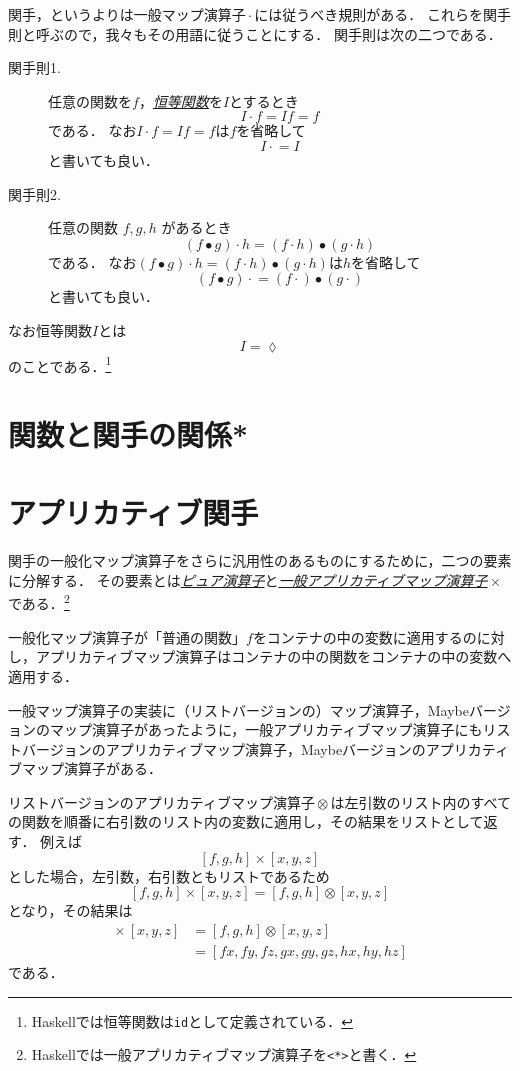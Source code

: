 \documentclass[twocolumn]{jsbook}
\newcommand{\keyword}[1]{\underline{\emph{#1}}}
\newcommand{\code}[1]{\texttt{#1}}
\DeclareMathOperator{\hsklApplicativeMap}{\times}
\DeclareMathOperator{\hsklApplicativeListMap}{\otimes}
\DeclareMathOperator{\hsklFmap}{\cdot}
\DeclareMathOperator{\mathCompose}{\bullet}
\newcommand{\mathLambdaAnonymousParameter}{\lozenge}
\begin{document}
関手，というよりは一般マップ演算子$\hsklFmap$には従うべき規則がある．
これらを関手則と呼ぶので，我々もその用語に従うことにする．
関手則は次の二つである．
\begin{description}
\item[関手則1.] 任意の関数を$f$，\keyword{恒等関数}を$I$とするとき
$$I\hsklFmap f=If=f$$
である．
なお$I\hsklFmap f=If=f$は$f$を省略して
$$I\hsklFmap=I$$
と書いても良い．
\item[関手則2.] 任意の関数 $f,g,h$ があるとき
$$(f\mathCompose g)\hsklFmap h=(f\hsklFmap h)\mathCompose(g\hsklFmap h)$$
である．
なお$(f\mathCompose g)\hsklFmap h=(f\hsklFmap h)\mathCompose(g\hsklFmap h)$は$h$を省略して$$(f\mathCompose g)\hsklFmap=(f\hsklFmap)\mathCompose(g\hsklFmap)$$と書いても良い．
\end{description}
なお恒等関数$I$とは
$$I=\mathLambdaAnonymousParameter$$
のことである．\footnote{Haskellでは恒等関数は\code{id}として定義されている．}

\section{関数と関手の関係*}


\section{アプリカティブ関手}

関手の一般化マップ演算子をさらに汎用性のあるものにするために，二つの要素に分解する．
その要素とは\keyword{ピュア演算子}と\keyword{一般アプリカティブマップ演算子}$\hsklApplicativeMap$である．\footnote{Haskellでは一般アプリカティブマップ演算子を\code{<*>}と書く．}

一般化マップ演算子が「普通の関数」$f$をコンテナの中の変数に適用するのに対し，アプリカティブマップ演算子はコンテナの中の関数をコンテナの中の変数へ適用する．

一般マップ演算子の実装に（リストバージョンの）マップ演算子，Maybeバージョンのマップ演算子があったように，一般アプリカティブマップ演算子にもリストバージョンのアプリカティブマップ演算子，Maybeバージョンのアプリカティブマップ演算子がある．

リストバージョンのアプリカティブマップ演算子$\hsklApplicativeListMap$は左引数のリスト内のすべての関数を順番に右引数のリスト内の変数に適用し，その結果をリストとして返す．
例えば$$[f,g,h]\hsklApplicativeMap[x,y,z]$$とした場合，左引数，右引数ともリストであるため$$[f,g,h]\hsklApplicativeMap[x,y,z]=[f,g,h]\hsklApplicativeListMap[x,y,z]$$となり，その結果は
\begin{align*}
[f,g,h]\hsklApplicativeMap[x,y,z]&=[f,g,h]\hsklApplicativeListMap[x,y,z]\\
&=[fx,fy,fz,gx,gy,gz,hx,hy,hz]
\end{align*}
である．
\end{document}
